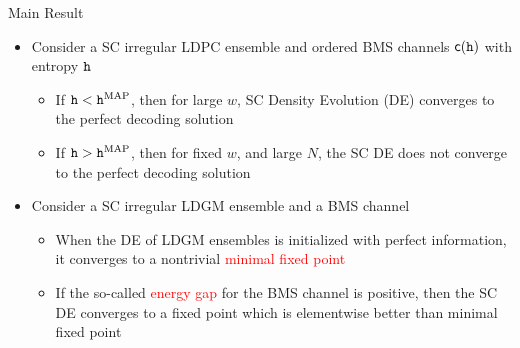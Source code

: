 \documentclass{beamer}
\newlength{\onecolwid}
\begin{document}
\begin{columns}[t]
\begin{column}{\onecolwid}
    \vspace{2cm}
    \begin{alertblock}{\Large Main Result}
      \begin{itemize}
      \item Consider a SC irregular LDPC ensemble and ordered BMS channels $\mathsf{c}(\texttt{h})$ with entropy $\texttt{h}$ 
        \begin{itemize}
        \item \vspace{0.75cm} If $\texttt{h} < \texttt{h}^{\mathrm{MAP}}$, then for large $w$, SC Density Evolution (DE) converges to the perfect decoding solution
        \item \vspace{0.75cm} If $\texttt{h} > \texttt{h}^{\mathrm{MAP}}$, then for fixed $w$, and large $N$, the SC DE does not converge to the perfect decoding solution
        \end{itemize}
        \vspace{1.5cm}
      \item Consider a SC irregular LDGM ensemble and a BMS channel
        \begin{itemize}
        \item \vspace{0.75cm} When the DE of LDGM ensembles is initialized with perfect information, it converges to a nontrivial \textcolor{red}{minimal fixed point}
        \item \vspace{0.75cm} If the so-called \textcolor{red}{energy gap} for the BMS channel is positive, then the SC DE converges to a fixed point which is elementwise better than minimal fixed point
        \end{itemize}
      \end{itemize}
    \end{alertblock}


\end{column}
\end{columns}
\end{document}
